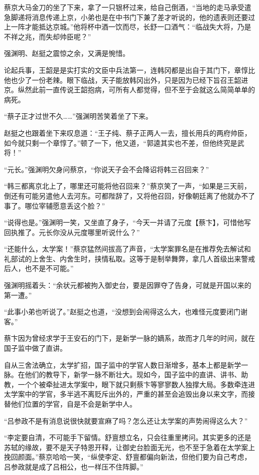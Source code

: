 蔡京大马金刀的坐了下来，拿了一只银杯过来，给自己倒酒，“当地的走马承受遣急脚递将消息传递上京，小弟也是在中书门下兼了差才听说的，他的遗表则还要过上一阵才能抵达京城。”他将杯中酒一饮而尽，长舒一口酒气：“临战失大将，乃是不祥之兆，而失却帅臣呢？”

强渊明、赵挺之震惊之余，又满是惋惜。

论起兵事，王韶是是实打实的文臣中兵法第一，连韩冈都是出自于其门下，章惇比他也少了一份老辣。眼下临战，天子能放韩冈出外，只是因为已经下旨召王韶进京。纵然此前一直传说王韶抱病，可所有人都觉得，但不至于会就这么简简单单的病死。

“蔡子正才过世不久……”强渊明苦笑着坐了下来。

赵挺之也跟着坐下来叹息道：“王子纯、蔡子正两人一去，擅长用兵的两府帅臣，如今就只剩一个章惇了。”顿了一下，他又道，“郭逵其实也不差，但他终究是武将！”

“元长。”强渊明欠身问蔡京，“你说天子会不会降诏将韩三召回来？”

“韩三都离京北上了，哪里还可能将他召回来？”蔡京笑了一声，“如果是三天前，倒还有可能另遣他人去河东。可都陛辞了，又将他召回，好像朝廷离了他就办不了事了。哪位宰辅愿意丢这个脸？”

“说得也是。”强渊明一笑，又坐直了身子，“今天一并请了元度【蔡卞】，可惜他写回执推了。元长你没从元度哪里听说什么？”

“还能什么，太学案！”蔡京猛然间拔高了声音，“太学案罪名是在推荐免去解试和礼部试的上舍生、内舍生时，挟情私取。这等于是制举舞弊，拿几人首级出来警戒后人，也不是不可能。”

强渊明摇着头：“余状元都被拘入御史台，要是因罪夺了告身，可就是开国以来的第一遭。”

“此事小弟也听说了。”赵挺之也道，“没想到会闹得这么大，也难怪元度要闭门谢客。”

蔡卞因为曾经求学于王安石的门下，是新学一脉的嫡系，故而才几年的时间，就在国子监中做了直讲。

自从三舍法确立，太学扩招，国子监中的学官人数日渐增多，基本上都是新学一脉。在他们的教导下，新学一脉不断壮大。现如今，国子监中的直讲、讲书、助教，一个个被牵扯进太学案中，眼下就只剩蔡卞等寥寥数人独撑大局。多数牵连进太学案中的学官，多半逃不离贬斥出外的，严重的甚至会追毁出身以来文字，而接替他们位置的学官，自是不会是新学中人。

“吕参政不是有消息说很快就要宣麻了吗？怎么还让太学案的声势闹得这么大？”

“李定要自清，不可能手下留情。舒亶想立名，只会往重里拷问。其实更多的还是苏轼的缘故，要不是天子特恩开释，让御史台脸面无光，也不至于急着在太学案上挽回颜面。”蔡京哈哈一笑，“纵使李定、舒亶都偏向新法，但他们要为自己考虑，吕参政就是成了吕相公，也一样压不住阵脚。”

